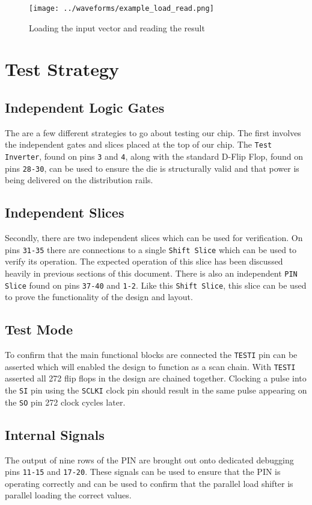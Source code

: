 \begin{figure}[H]
    \centering
    \texttt{[image: ../waveforms/example\_load\_read.png]}
    \caption{Loading the input vector and reading the result}
\end{figure}


\section{Test Strategy}

\subsection{Independent Logic Gates}
The are a few different strategies to go about testing our chip. The first
involves the independent gates and slices placed at the top of our chip.  The
\texttt{Test Inverter}, found on pins \texttt{3} and \texttt{4}, along with the
standard D-Flip Flop, found on pins \texttt{28-30}, can be used to ensure the
die is structurally valid and that power is being delivered on the distribution
rails.

\subsection{Independent Slices}
Secondly, there are two independent slices which can be used for verification.
On pins \texttt{31-35} there are connections to a single \texttt{Shift Slice}
which can be used to verify its operation. The expected operation of this slice
has been discussed heavily in previous sections of this document. There is also
an independent \texttt{PIN Slice} found on pins \texttt{37-40} and \texttt{1-2}.
Like this \texttt{Shift Slice}, this slice can be used to prove the functionality
of the design and layout.

\subsection{Test Mode}
To confirm that the main functional blocks are connected the \texttt{TESTI} pin
can be asserted which will enabled the design to function as a scan chain. With
\texttt{TESTI} asserted all 272 flip flops in the design are chained together.
Clocking a pulse into the \texttt{SI} pin using the \texttt{SCLKI} clock pin
should result in the same pulse appearing on the \texttt{SO} pin 272 clock
cycles later.

\subsection{Internal Signals}
The output of nine rows of the PIN are brought out onto dedicated debugging
pins \texttt{11-15} and \texttt{17-20}. These signals can be used to ensure
that the PIN is operating correctly and can be used to confirm that the
parallel load shifter is parallel loading the correct values.


